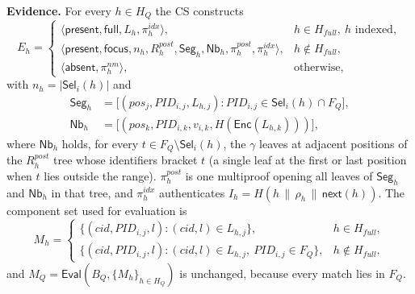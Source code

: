\textbf{Evidence.} For every $h \in H_Q$ the CS constructs
\begin{equation}
E_h =
\begin{cases}
\langle \mathsf{present}, \mathsf{full}, L_h, \pi^{idx}_h \rangle, & h \in H_{full},\ h \text{ indexed},\\
\langle \mathsf{present}, \mathsf{focus}, n_h, R^{post}_h, \mathsf{Seg}_h, \mathsf{Nb}_h,
        \pi^{post}_h, \pi^{idx}_h \rangle, & h \notin H_{full},\\
\langle \mathsf{absent}, \pi^{nm}_h \rangle, & \text{otherwise},
\end{cases}
\end{equation}
with $n_h = |\mathsf{Sel}_i(h)|$ and
\begin{align}
\mathsf{Seg}_h &= \big[(pos_j, PID_{i,j}, L_{h,j}) : PID_{i,j} \in \mathsf{Sel}_i(h) \cap F_Q \big],\\
\mathsf{Nb}_h &= \big[(pos_k, PID_{i,k}, v_{i,k}, H(\mathsf{Enc}(L_{h,k})))\big],
\end{align}
where $\mathsf{Nb}_h$ holds, for every $t \in F_Q \setminus \mathsf{Sel}_i(h)$, the $\gamma$ leaves at
adjacent positions of the $R^{post}_h$ tree whose identifiers bracket $t$ (a single leaf at the first or
last position when $t$ lies outside the range). $\pi^{post}_h$ is one multiproof opening all leaves of
$\mathsf{Seg}_h$ and $\mathsf{Nb}_h$ in that tree, and $\pi^{idx}_h$ authenticates
$I_h = H(h \,\|\, \rho_h \,\|\, \mathsf{next}(h))$.
The component set used for evaluation is
\begin{equation}
M_h =
\begin{cases}
\{(cid, PID_{i,j}, l) : (cid,l) \in L_{h,j}\}, & h \in H_{full},\\
\{(cid, PID_{i,j}, l) : (cid,l) \in L_{h,j},\ PID_{i,j} \in F_Q\}, & h \notin H_{full},
\end{cases}
\end{equation}
and $M_Q = \mathsf{Eval}(B_Q, \{M_h\}_{h \in H_Q})$ is unchanged, because every match lies in $F_Q$.



